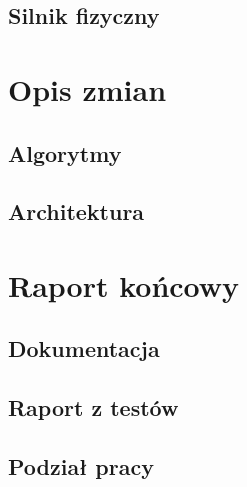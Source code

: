 \documentclass[a4paper,titlepage,10pt]{report}
\begin{document}
	\section{Silnik fizyczny}\label{sec:silnik fizyczny}
	

	\chapter{Opis zmian}\label{chap:opis zmian}
	\section{Algorytmy}\label{sec:algorytmy}
	
	\section{Architektura}\label{sec:architektura-zmiany}
	

	\chapter{Raport końcowy}\label{chap:raport końcowy}
	\section{Dokumentacja}\label{sec:dokumentacja}
	
	\section{Raport z testów}\label{sec:raport z testów}
	
	\section{Podział pracy}\label{sec:podzial}
	

	

	\newpage
	
	\newpage
\end{document}
